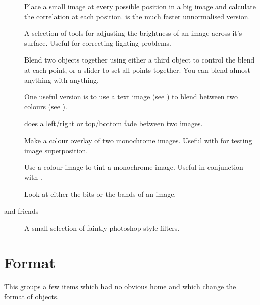 \begin{description}
\item[]
	Place a small image at every possible position in a big image and
	calculate the correlation at each position.  is
	the much faster unnormalised version.

\item[]
	A selection of tools for adjusting the brightness of an image across
	it's surface. Useful for correcting lighting problems.

\item[]
	Blend two objects together using either a third object to control the
	blend at each point, or a slider to set all points together. You can
	blend almost anything with anything.

	One useful version is to use a text image (see ) to blend between two colours (see
	).

	 does a left/right or top/bottom fade between two
	images.

\item[]
	Make a colour overlay of two monochrome images. Useful with
	 for testing image superposition.

\item[]
	Use a colour image to tint a monochrome image. Useful in conjunction
	with .

\item[]
	Look at either the bits or the bands of an image.

\item[ and friends]
	A small selection of faintly photoshop-style filters. 

\end{description}

\section{Format}

This groups a few items which had no obvious home and which change the format
of objects.

